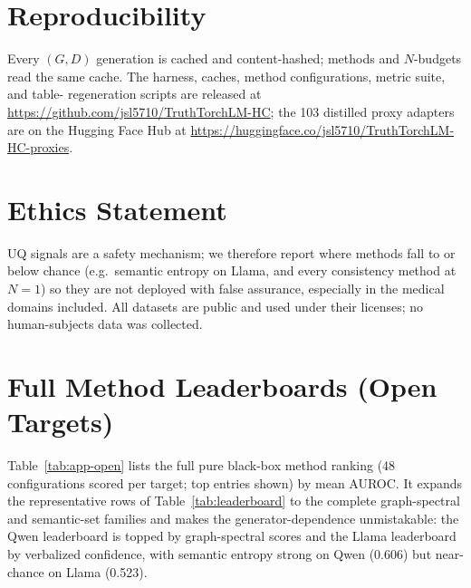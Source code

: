 \documentclass[11pt]{article}
\begin{document}
\section*{Reproducibility}
Every $(G,D)$ generation is cached and content-hashed; methods and $N$-budgets read the
same cache. The harness, caches, method configurations, metric suite, and table-%
regeneration scripts are released at \url{https://github.com/jsl5710/TruthTorchLM-HC}; the
103 distilled proxy adapters are on the Hugging Face Hub at
\url{https://huggingface.co/jsl5710/TruthTorchLM-HC-proxies}.

\section*{Ethics Statement}
UQ signals are a safety mechanism; we therefore report where methods fall to or below
chance (e.g.\ semantic entropy on Llama, and every consistency method at $N{=}1$) so they
are not deployed with false assurance, especially in the medical domains included. All
datasets are public and used under their licenses; no human-subjects data was collected.



\appendix

\section{Full Method Leaderboards (Open Targets)}\label{app:leaderboard}
Table~\ref{tab:app-open} lists the full pure black-box method ranking (48 configurations
scored per target; top entries shown) by mean AUROC. It expands the representative rows of
Table~\ref{tab:leaderboard} to the complete graph-spectral and semantic-set families and
makes the generator-dependence unmistakable: the Qwen leaderboard is topped by
graph-spectral scores and the Llama leaderboard by verbalized confidence, with semantic
entropy strong on Qwen (0.606) but near-chance on Llama (0.523).
\end{document}
